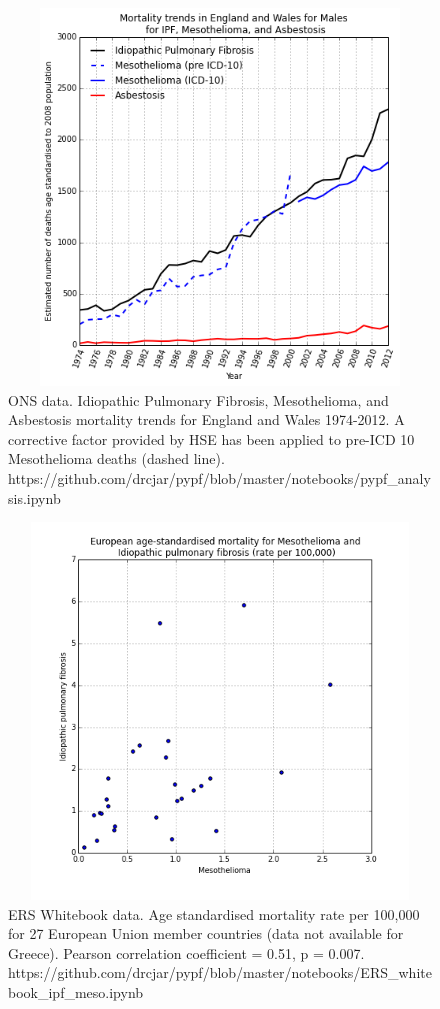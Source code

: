 \documentclass[a4paper,10pt]{article}
\begin{document}
\begin{appendices}
\begin{figure}[htp]
\centering
\includegraphics[width=12cm,height=10cm]{fig/uk-ipf-meso-asb-mortality-trends.png}
\caption{ONS data. Idiopathic Pulmonary Fibrosis, Mesothelioma, and Asbestosis mortality trends for England and Wales 1974-2012. A corrective factor provided by HSE has been applied to pre-ICD 10 Mesothelioma deaths (dashed line). https://github.com/drcjar/pypf/blob/master/notebooks/pypf\_analysis.ipynb}
\end{figure}

\newpage

\begin{figure}[htp]
\centering
\includegraphics[width=12cm,height=10cm]{fig/european-meso-ipf-assoc.png}
\caption{ERS Whitebook data. Age standardised mortality rate per 100,000 for 27 European Union member countries (data not available for Greece). Pearson correlation coefficient = 0.51, p = 0.007. https://github.com/drcjar/pypf/blob/master/notebooks/ERS\_whitebook\_ipf\_meso.ipynb}
\end{figure}


\end{appendices}
\end{document}
